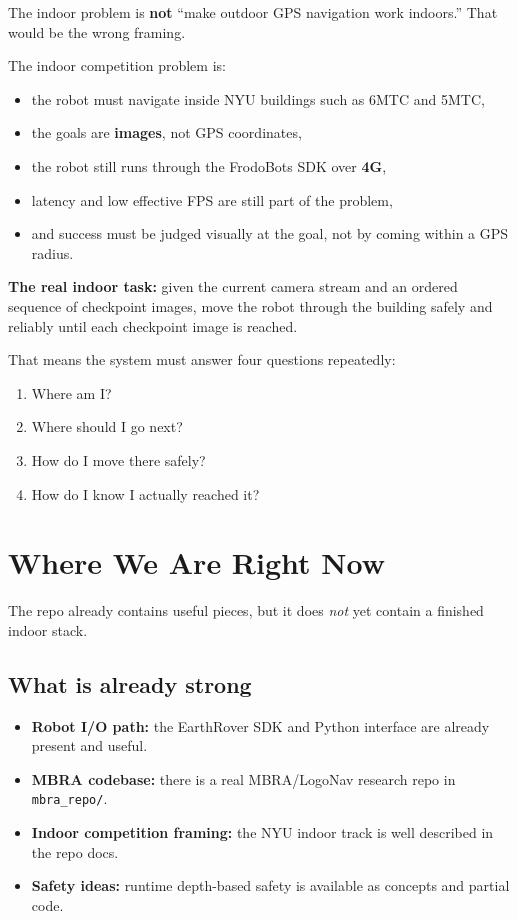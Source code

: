 \documentclass[11pt,a4paper]{article}
\begin{document}
The indoor problem is \textbf{not} ``make outdoor GPS navigation work indoors.''
That would be the wrong framing.

The indoor competition problem is:
\begin{itemize}[nosep]
  \item the robot must navigate inside NYU buildings such as 6MTC and 5MTC,
  \item the goals are \textbf{images}, not GPS coordinates,
  \item the robot still runs through the FrodoBots SDK over \textbf{4G},
  \item latency and low effective FPS are still part of the problem,
  \item and success must be judged visually at the goal, not by coming within
        a GPS radius.
\end{itemize}

\begin{mdframed}
\textbf{The real indoor task:} given the current camera stream and an ordered
sequence of checkpoint images, move the robot through the building safely and
reliably until each checkpoint image is reached.
\end{mdframed}

That means the system must answer four questions repeatedly:
\begin{enumerate}[nosep]
  \item Where am I?
  \item Where should I go next?
  \item How do I move there safely?
  \item How do I know I actually reached it?
\end{enumerate}


\section{Where We Are Right Now}

The repo already contains useful pieces, but it does \emph{not} yet contain a
finished indoor stack.

\subsection{What is already strong}

\begin{itemize}[nosep]
  \item \textbf{Robot I/O path:} the EarthRover SDK and Python interface are already
        present and useful.
  \item \textbf{MBRA codebase:} there is a real MBRA/LogoNav research repo in
        \texttt{mbra\_repo/}.
  \item \textbf{Indoor competition framing:} the NYU indoor track is well described in
        the repo docs.
  \item \textbf{Safety ideas:} runtime depth-based safety is available as
        concepts and partial code.
\end{itemize}
\end{document}
